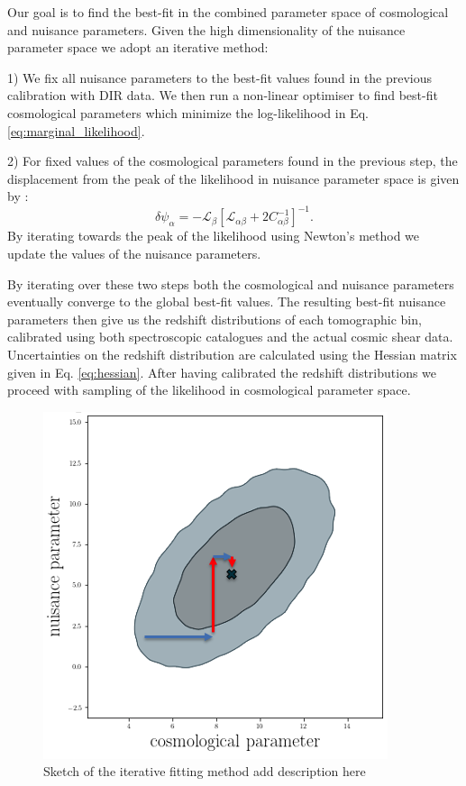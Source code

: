 \documentclass{aa}
\begin{document}
Our goal is to find the best-fit in the combined parameter space of cosmological and nuisance parameters. Given the high dimensionality of the nuisance parameter space we adopt an iterative method:

1) We fix all nuisance parameters to the best-fit values found in the previous calibration with DIR data. We then run a non-linear optimiser to find best-fit cosmological parameters which minimize the log-likelihood in Eq. \ref{eq:marginal_likelihood}.

2) For fixed values of the cosmological parameters found in the previous step, the displacement from the peak of the likelihood in nuisance parameter space is given by \citep{taylor10}:
\begin{equation}
\delta\psi_\alpha = -\mathcal{L}_\beta\left[\mathcal{L}_{\alpha\beta}+2C_{\alpha\beta}^{-1}\right]^{-1}. 
\end{equation}
By iterating towards the peak of the likelihood using Newton's method we update the values of the nuisance parameters.

By iterating over these two steps both the cosmological and nuisance parameters eventually converge to the global best-fit values. The resulting best-fit nuisance parameters then give us the redshift distributions of each tomographic bin, calibrated using both spectroscopic catalogues and the actual cosmic shear data. Uncertainties on the redshift distribution are calculated using the Hessian matrix given in Eq. \ref{eq:hessian}. After having calibrated the redshift distributions we proceed with sampling of the likelihood in cosmological parameter space.
\begin{figure}
\label{fig:iterative_calibration}
\centering
\includegraphics[scale=0.4]{plots/iterative.png}
\caption{Sketch of the iterative fitting method {\color{red} add description here}}
\label{fig:comb}
\end{figure}
\end{document}
